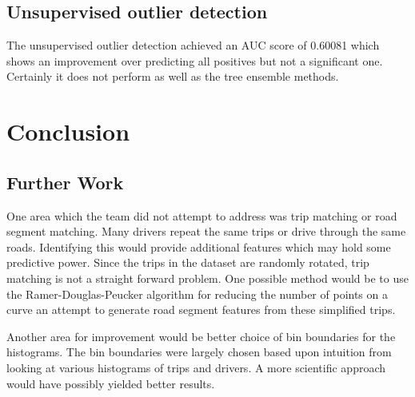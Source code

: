 \documentclass[a4paper, 11pt, twocolumn]{report}
\begin{document}
\subsection{Unsupervised outlier detection}
The unsupervised outlier detection achieved an AUC score of 0.60081 which shows an improvement over predicting all positives but not a significant one. 
Certainly it does not perform as well as the tree ensemble methods.

\section{Conclusion}

\subsection{Further Work}
One area which the team did not attempt to address was trip matching or road segment matching. Many drivers repeat the same trips or drive through the same roads. Identifying this would provide additional features which may hold some predictive power. Since the trips in the dataset are randomly rotated, trip matching is not a straight forward problem. One possible method would be to use the Ramer-Douglas-Peucker algorithm\cite{ramer1972iterative} for reducing the number of points on a curve an attempt to generate road segment features from these simplified trips.

Another area for improvement would be better choice of bin boundaries for the histograms. The bin boundaries were largely chosen based upon intuition from looking at various histograms of trips and drivers. A more scientific approach would have possibly yielded better results.


\printbibliography
\end{document}
